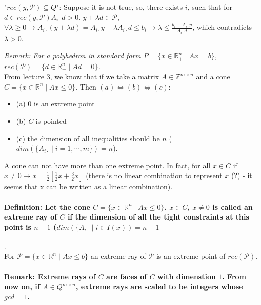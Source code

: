 \documentclass[main]{subfiles}
\begin{document}
"$rec(y, \mathcal{P}) \subseteq Q$": Suppose it is not true, so, there exists
$i$, such that for $d \in rec(y, \mathcal{P}) A_{i\cdot}d > 0$. $y+ \lambda d
\in \mathcal{P}$, $\forall \lambda \geq 0 \rightarrow A_{i\cdot} (y + \lambda
d) = A_{i\cdot}y + \lambda A_{i\cdot} d \leq b_i \rightarrow \lambda \leq
\frac{b_i - A_{i\cdot}y}{A_{i\cdot}d}$, which contradicts $\lambda > 0$.


\emph{Remark: For a polyhedron in standard form $P=\{x \in \mathbb{R}^n_+ \mid
Ax = b \}$, $rec(\mathcal{P}) = \{d \in \mathbb{R}^n_+ \mid Ad = 0 \}$. }\\

From lecture 3, we know that if we take a matrix $A \in \mathbb{Z}^{m\times n}$
and a cone $C = \{x \in \mathbb{R}^n \mid Ax \leq 0 \}$. Then $(a) \iff (b)
\iff (c)$:
\begin{itemize}
\item (a) $0$ is an extreme point
\item (b) $C$ is pointed
\item (c) the dimension of all inequalities should be $n$ ($dim(\{A_{i\cdot} 
\mid i = 1, \cdots, m \}) = n$). 
\end{itemize}

A cone can not have more than one extreme point. In fact, for all $x \in C$ if
$x \neq 0 \rightarrow x = \frac{1}{2}[\frac{1}{2}x + \frac{3}{2}x]$ (there is
no linear combination to represent $x$ (?) - it seems that x can be written as
a linear combination).


\paragraph{Definition: Let the cone $C =\{x \in \mathbb{R}^n \mid Ax \leq 0\}$.
$x \in C$, $ x \neq 0$ is called an extreme ray of $C$ if the dimension of all
the tight constraints at this point is $n-1$ ($dim(\{A_{i\cdot} \mid i \in
I(x)) = n-1$}.\\
For $\mathcal{P} = \{x \in \mathbb{R}^n \mid Ax \leq b \}$ an extreme ray of
$\mathcal{P}$ is an extreme point of $rec(\mathcal{P})$.

\paragraph{Remark: Extreme rays of $C$ are faces of $C$ with dimenstion $1$. 
From now on, if $A \in Q^{m \times n}$, extreme rays are scaled to be integers 
whose $gcd = 1$.}
\end{document}
